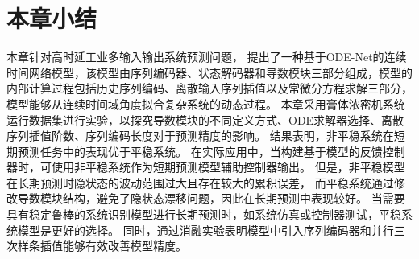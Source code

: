 \section{本章小结}
\label{sec:conc}
本章针对高时延工业多输入输出系统预测问题，
提出了一种基于ODE-Net的连续时间网络模型，该模型由序列编码器、状态解码器和导数模块三部分组成，模型的内部计算过程包括历史序列编码、离散输入序列插值以及常微分方程求解三部分，模型能够从连续时间域角度拟合复杂系统的动态过程。
本章采用膏体浓密机系统运行数据集进行实验，以探究导数模块的不同定义方式、ODE求解器选择、离散序列插值阶数、序列编码长度对于预测精度的影响。
结果表明，非平稳系统在短期预测任务中的表现优于平稳系统。
在实际应用中，当构建基于模型的反馈控制器时，可使用非平稳系统作为短期预测模型辅助控制器输出。
但是，非平稳模型在长期预测时隐状态的波动范围过大且存在较大的累积误差，
而平稳系统通过修改导数模块结构，避免了隐状态漂移问题，因此在长期预测中表现较好。
当需要具有稳定鲁棒的系统识别模型进行长期预测时，如系统仿真或控制器测试，平稳系统模型是更好的选择。
同时，通过消融实验表明模型中引入序列编码器和并行三次样条插值能够有效改善模型精度。


